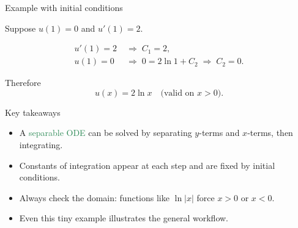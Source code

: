 \documentclass[11pt,aspectratio=169]{beamer}
\begin{document}
\begin{frame}{Example with initial conditions}
\begin{small}
Suppose $u(1)=0$ and $u'(1)=2$.

\begin{align*}
u'(1)=2 &\;\Rightarrow\; C_1=2, \\
u(1)=0 &\;\Rightarrow\; 0=2\ln 1+C_2 \;\Rightarrow\; C_2=0.
\end{align*}

Therefore
\[
u(x)=2\ln x \quad \text{(valid on $x>0$)}.
\]
\end{small}
\end{frame}

\begin{frame}{Key takeaways}
\begin{small}
\begin{itemize}
  \item A \textcolor{SeaGreen}{separable ODE} can be solved by separating $y$-terms and $x$-terms, then integrating.
  \item Constants of integration appear at each step and are fixed by initial conditions.
  \item Always check the domain: functions like $\ln|x|$ force $x>0$ or $x<0$.
  \item Even this tiny example illustrates the general workflow.
\end{itemize}
\end{small}
\end{frame}
\end{document}
